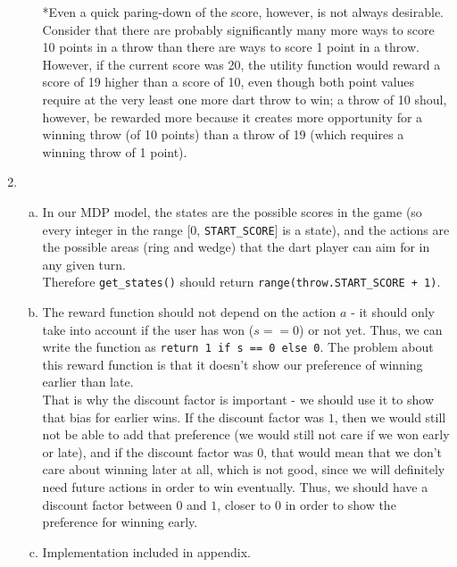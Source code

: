 \documentclass{article}
\begin{document}
\begin{enumerate}
\begin{enumerate}[(a)]
                *Even a quick paring-down of the score, however, is not always desirable. Consider that there are probably significantly many more ways to score 10 points in a throw than there are ways to score 1 point in a throw. However, if the current score was 20, the utility function would reward a score of 19 higher than a score of 10, even though both point values require at the very least one more dart throw to win; a throw of 10 shoul, however, be rewarded more because it creates more opportunity for a winning throw (of 10 points) than a throw of 19 (which requires a winning throw of 1 point).
            \end{enumerate}
        \item
            \begin{enumerate}[(a)]
                \item In our MDP model, the states are the possible scores in the game (so every integer in the range [0, \texttt{START\_SCORE}] is a state), and the actions are the possible areas (ring and wedge) that the dart player can aim for in any given turn. \\

                Therefore \texttt{get\_states()} should return \texttt{range(throw.START\_SCORE + 1)}.
                
                \item The reward function should not depend on the action $a$ - it should only take into account if the user has won ($s==0$) or not yet.  Thus, we can write the function as \texttt{return 1 if s == 0 else 0}. The problem about this reward function is that it doesn't show our preference of winning earlier than late.\\
                
               That is why the discount factor is important - we should use it to show that bias for earlier wins. If the discount factor was $1$, then we would still not be able to add that preference (we would still not care if we won early or late), and if the discount factor was $0$, that would mean that we don't care about winning later at all, which is not good, since we will definitely need future actions in order to win eventually. Thus, we should have a discount factor between $0$ and $1$, closer to $0$ in order to show the preference for winning early.
                 \item Implementation included in appendix.
                

\end{enumerate}
\end{enumerate}
\end{document}
